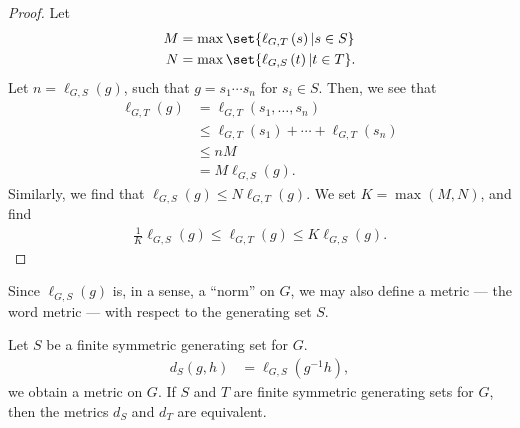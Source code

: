 \documentclass[10pt]{mypackage}
\begin{document}
\begin{proof}
  Let
  \begin{align*}
    M &= \max\set{\ell_{G,T}\left(s\right) | s\in S}\\
    N &= \max\set{\ell_{G,S}\left(t\right) | t\in T}.
  \end{align*}
  Let $n = \ell_{G,S}\left(g\right)$, such that $g = s_1\cdots s_n$ for $s_i\in S$. Then, we see that
  \begin{align*}
    \ell_{G,T}\left(g\right) &= \ell_{G,T}\left(s_1,\dots,s_n\right)\\
                             &\leq \ell_{G,T}\left(s_1\right) + \cdots + \ell_{G,T}\left(s_n\right)\\
                             &\leq nM\\
                             &= M\ell_{G,S}\left(g\right).
  \end{align*}
  Similarly, we find that $\ell_{G,S}\left(g\right) \leq N\ell_{G,T}\left(g\right)$. We set $K = \max\left(M,N\right)$, and find 
  \begin{align*}
    \frac{1}{K}\ell_{G,S}\left(g\right) \leq \ell_{G,T}\left(g\right) \leq K\ell_{G,S}\left(g\right).
  \end{align*}
\end{proof}
Since $\ell_{G,S}\left(g\right)$ is, in a sense, a ``norm'' on $G$, we may also define a metric --- the word metric --- with respect to the generating set $S$.
\begin{fact}
  Let $S$ be a finite symmetric generating set for $G$. 
  \begin{align*}
    d_{S}\left(g,h\right) &= \ell_{G,S}\left(g^{-1}h\right),
  \end{align*}
  we obtain a metric on $G$. If $S$ and $T$ are finite symmetric generating sets for $G$, then the metrics $d_S$ and $d_T$ are equivalent.
\end{fact}
\end{document}
